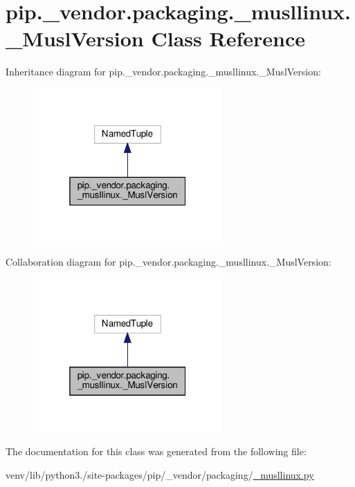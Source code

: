 \hypertarget{classpip_1_1__vendor_1_1packaging_1_1__musllinux_1_1__MuslVersion}{}\section{pip.\+\_\+vendor.\+packaging.\+\_\+musllinux.\+\_\+\+Musl\+Version Class Reference}
\label{classpip_1_1__vendor_1_1packaging_1_1__musllinux_1_1__MuslVersion}


Inheritance diagram for pip.\+\_\+vendor.\+packaging.\+\_\+musllinux.\+\_\+\+Musl\+Version\+:
\nopagebreak
\begin{figure}[H]
\begin{center}
\leavevmode
\includegraphics[width=205pt]{classpip_1_1__vendor_1_1packaging_1_1__musllinux_1_1__MuslVersion__inherit__graph}
\end{center}
\end{figure}


Collaboration diagram for pip.\+\_\+vendor.\+packaging.\+\_\+musllinux.\+\_\+\+Musl\+Version\+:
\nopagebreak
\begin{figure}[H]
\begin{center}
\leavevmode
\includegraphics[width=205pt]{classpip_1_1__vendor_1_1packaging_1_1__musllinux_1_1__MuslVersion__coll__graph}
\end{center}
\end{figure}


The documentation for this class was generated from the following file\+:\begin{DoxyCompactItemize}
\item 
venv/lib/python3./site-\/packages/pip/\+\_\+vendor/packaging/\hyperlink{__musllinux_8py}{\+\_\+musllinux.\+py}\end{DoxyCompactItemize}
